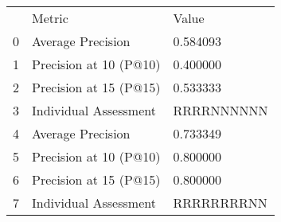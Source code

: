 \begin{tabular}{lll}
 & Metric & Value \\
0 & Average Precision & 0.584093 \\
1 & Precision at 10 (P@10) & 0.400000 \\
2 & Precision at 15 (P@15) & 0.533333 \\
3 & Individual Assessment & RRRRNNNNNN \\
4 & Average Precision & 0.733349 \\
5 & Precision at 10 (P@10) & 0.800000 \\
6 & Precision at 15 (P@15) & 0.800000 \\
7 & Individual Assessment & RRRRRRRRNN \\
\end{tabular}
